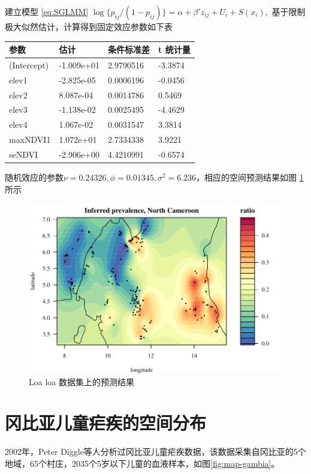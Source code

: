 \documentclass[hyperref, a4paper, UTF8, zihao = -4, linespread = 1.25, scheme = chinese]{ctexbook}
\begin{document}
建立模型 \eqref{eq:SGLMM}
\(\log\{p_{ij}/(1-p_{ij})\} = \alpha + \beta'z_{ij} + U_{i} + S(x_{i}),\)
基于限制极大似然估计，计算得到固定效应参数如下表

\begin{longtable}[]{@{}llll@{}}
\toprule
参数 & 估计 & 条件标准差 & t 统计量\tabularnewline
\midrule
\endhead
(Intercept) & -1.009e+01 & 2.9790516 & -3.3874\tabularnewline
elev1 & -2.825e-05 & 0.0006196 & -0.0456\tabularnewline
elev2 & 8.087e-04 & 0.0014786 & 0.5469\tabularnewline
elev3 & -1.138e-02 & 0.0025495 & -4.4629\tabularnewline
elev4 & 1.067e-02 & 0.0031547 & 3.3814\tabularnewline
maxNDVI1 & 1.072e+01 & 2.7334338 & 3.9221\tabularnewline
seNDVI & -2.906e+00 & 4.4210991 & -0.6574\tabularnewline
\bottomrule
\end{longtable}

随机效应的参数\(\nu = 0.24326,\phi = 0.01345,\sigma^2 = 6.236\)，相应的空间预测结果如图
\ref{fig:spamm-loaloa}所示

\begin{figure}

{\centering \includegraphics[width=0.7\linewidth]{figures/spaMM-loaloa} 

}

\caption{Loa loa 数据集上的预测结果}\label{fig:spamm-loaloa}
\end{figure}

\section{冈比亚儿童疟疾的空间分布}

2002年，Peter
Diggle等人分析过冈比亚儿童疟疾数据，该数据采集自冈比亚的5个地域，65个村庄，2035个5岁以下儿童的血液样本，如图\ref{fig:map-gambia}。
\end{document}
